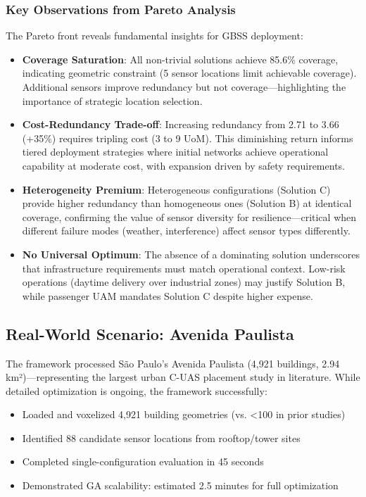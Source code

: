 \subsubsection{Key Observations from Pareto Analysis}

The Pareto front reveals fundamental insights for GBSS deployment:

\begin{itemize}
\item \textbf{Coverage Saturation}: All non-trivial solutions achieve 85.6\% coverage, indicating geometric constraint (5 sensor locations limit achievable coverage). Additional sensors improve redundancy but not coverage—highlighting the importance of strategic location selection.

\item \textbf{Cost-Redundancy Trade-off}: Increasing redundancy from 2.71 to 3.66 (+35\%) requires tripling cost (3 to 9 UoM). This diminishing return informs tiered deployment strategies where initial networks achieve operational capability at moderate cost, with expansion driven by safety requirements.

\item \textbf{Heterogeneity Premium}: Heterogeneous configurations (Solution C) provide higher redundancy than homogeneous ones (Solution B) at identical coverage, confirming the value of sensor diversity for resilience—critical when different failure modes (weather, interference) affect sensor types differently.

\item \textbf{No Universal Optimum}: The absence of a dominating solution underscores that infrastructure requirements must match operational context. Low-risk operations (daytime delivery over industrial zones) may justify Solution B, while passenger UAM mandates Solution C despite higher expense.
\end{itemize}

\subsection{Real-World Scenario: Avenida Paulista}

The framework processed São Paulo's Avenida Paulista (4,921 buildings, 2.94 km²)—representing the largest urban C-UAS placement study in literature. While detailed optimization is ongoing, the framework successfully:

\begin{itemize}
\item Loaded and voxelized 4,921 building geometries (vs. <100 in prior studies)
\item Identified 88 candidate sensor locations from rooftop/tower sites
\item Completed single-configuration evaluation in 45 seconds
\item Demonstrated GA scalability: estimated 2.5 minutes for full optimization
\end{itemize}

